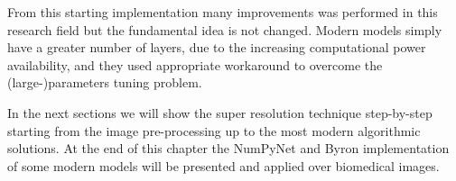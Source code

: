 \documentclass{standalone}
\begin{document}
From this starting implementation many improvements was performed in this research field but the fundamental idea is not changed.
Modern models simply have a greater number of layers, due to the increasing computational power availability, and they used appropriate workaround to overcome the (large-)parameters tuning problem.

In the next sections we will show the super resolution technique step-by-step starting from the image pre-processing up to the most modern algorithmic solutions.
At the end of this chapter the \textsf{NumPyNet} and \textsf{Byron} implementation of some modern models will be presented and applied over biomedical images.

\end{document}
